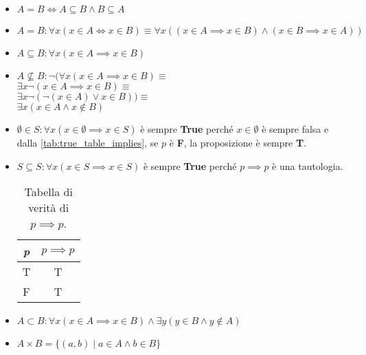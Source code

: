\begin{itemize}
    \item $A=B \iff A \subseteq B \wedge B \subseteq A$
    \item $A=B: \forall x(x \in A \iff x \in B) \equiv \forall x((x \in A \implies x \in B) \wedge (x \in B \implies x \in A))$
    \item $A \subseteq B: \forall x(x \in A \implies x \in B)$
    \item $A \not\subseteq B: \neg(\forall x(x \in A \implies x \in B) \equiv$ \\
        $\exists x \neg(x \in A \implies x \in B) \equiv$ \\
        $\exists x \neg(\neg (x \in A) \vee x \in B)) \equiv$ \\
        $\exists x(x \in A \wedge x \not\in B)$
    \item $\emptyset \in S: \forall x(x \in \emptyset \implies x \in S)$ è sempre \textbf{True} perché $x \in \emptyset$ è sempre falsa e dalla \autoref{tab:true_table_implies}, se $p$ è \textbf{F}, la proposizione è sempre \textbf{T}.
    \item $S \subseteq S: \forall x(x \in S \implies x \in S)$ è sempre \textbf{True} perché $p \implies p$ è una tautologia.
    \begin{table}[H]
    \centering
    \caption{\label{tab:true_table_p_implies_p}Tabella di verità di $p \implies p$.}
        \begin{tabular}{|c || c ||} 
         \hline
         \textit{p} & $p \implies p$ \\
         \hline\hline
         T & T \\ 
         \hline
         F & T \\
         \hline
        \end{tabular}
    \end{table}
    \item $A \subset B: \forall x(x \in A \implies x \in B) \wedge \exists y(y \in B \wedge y \not\in A)$
    \item $A \times B=\{(a, b)\mid a \in A \wedge b \in B\}$
\end{itemize}